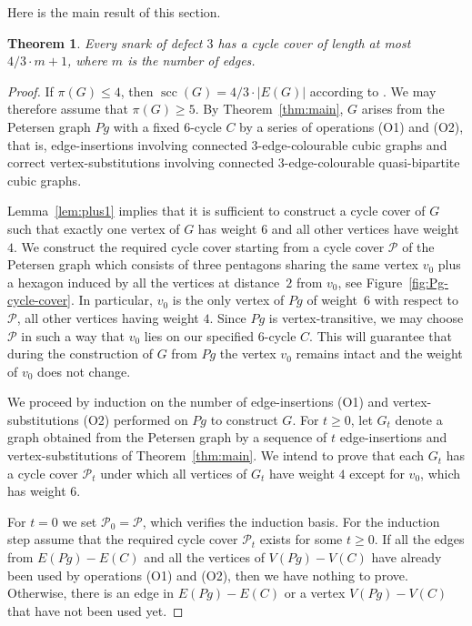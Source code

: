 \documentclass[a4paper]{amsart}
\newcommand{\scc}{\operatorname{scc}\xspace}
\theoremstyle{plain}
\newtheorem{theorem}{Theorem}[section]
\theoremstyle{definition}
\begin{document}
Here is the main result of this section.

\begin{theorem}\label{thm:scc-def3}
Every snark of defect $3$ has a cycle cover of length at
most $4/3\cdot m+1$, where $m$ is the number of edges.
\end{theorem}

\begin{proof}
If $\pi(G)\le4$, then $\scc(G)=4/3\cdot|E(G)|$ according to
\cite[Theorem~3.1]{S2}. We may therefore assume that
$\pi(G)\ge5$. By Theorem~\ref{thm:main}, $G$ arises from the
Petersen graph $Pg$ with a fixed $6$-cycle $C$ by a series of
operations (O1) and (O2), that is, edge-insertions involving
connected $3$-edge-colourable cubic graphs and correct
vertex-substitutions involving connected $3$-edge-colourable
quasi-bipartite cubic graphs.

Lemma~\ref{lem:plus1} implies that it is sufficient to
construct a cycle cover of $G$ such that exactly one vertex of
$G$ has weight $6$ and all other vertices have weight $4$. We
construct the required cycle cover starting from a cycle cover
$\mathcal{P}$ of the Petersen graph which consists of three
pentagons sharing the same vertex $v_0$ plus a hexagon induced
by all the vertices at distance~$2$ from $v_0$, see
Figure~\ref{fig:Pg-cycle-cover}. In particular, $v_0$ is the
only vertex of $Pg$ of weight~$6$ with respect to
$\mathcal{P}$, all other vertices having weight $4$. Since $Pg$
is vertex-transitive, we may choose $\mathcal{P}$ in such a way
that $v_0$ lies on our specified 6-cycle $C$. This will
guarantee that during the construction of $G$ from $Pg$ the
vertex $v_0$ remains intact and the weight of $v_0$ does not
change.

We proceed by induction on the number of edge-insertions (O1)
and vertex-substitutions (O2) performed on $Pg$ to construct
$G$. For $t\ge 0$, let $G_t$ denote a graph obtained from the
Petersen graph by a sequence of $t$ edge-insertions and
vertex-substitutions of Theorem~\ref{thm:main}. We intend to
prove that each $G_t$ has a cycle cover $\mathcal{P}_t$ under
which all vertices of $G_t$ have weight $4$ except for $v_0$,
which has weight $6$.

For $t=0$ we set $\mathcal{P}_0=\mathcal{P}$, which verifies
the induction basis. For the induction step assume that the
required cycle cover $\mathcal{P}_t$ exists for some $t\ge 0$.
If all the edges from $E(Pg)-E(C)$ and all the vertices of
$V(Pg)-V(C)$ have already been used by operations (O1) and
(O2), then we have nothing to prove. Otherwise, there is an
edge in $E(Pg)-E(C)$ or a vertex $V(Pg)-V(C)$ that have not
been used yet.


\end{proof}
\end{document}
